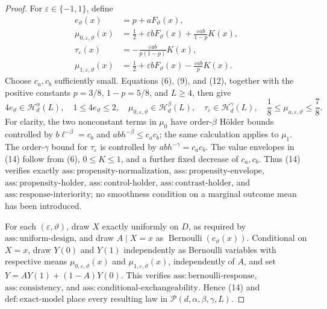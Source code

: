 \documentclass{article}
\begin{document}
\begin{proof}
For \(\varepsilon\in\{-1,1\}\), define
\[
\begin{aligned}
 e_\vartheta(x)&=p+aF_\vartheta(x),\\
 \mu_{0,\varepsilon,\vartheta}(x)
 &=\frac12+\varepsilon bF_\vartheta(x)
   +\frac{\varepsilon ab}{1-p}K(x),\\
 \tau_\varepsilon(x)&=-\frac{\varepsilon ab}{p(1-p)}K(x),\\
 \mu_{1,\varepsilon,\vartheta}(x)
 &=\frac12+\varepsilon bF_\vartheta(x)
   -\frac{\varepsilon ab}{p}K(x).
                                                                    \tag{13}
\end{aligned}
\]
Choose \(c_a,c_b\) sufficiently small.  Equations (6), (9), and (12), together with the positive constants \(p=3/8\), \(1-p=5/8\), and \(L\ge4\), then give
\[
 4e_\vartheta\in\mathcal H_d^\alpha(L),
 \quad 1\le4e_\vartheta\le2,
 \quad \mu_{0,\varepsilon,\vartheta}\in\mathcal H_d^\beta(L),
 \quad \tau_\varepsilon\in\mathcal H_d^\gamma(L),
 \quad \frac18\le\mu_{a,\varepsilon,\vartheta}\le\frac78.   \tag{14}
\]
For clarity, the two nonconstant terms in \(\mu_0\) have order-\(\beta\) H\"older bounds controlled by \(b\ell^{-\beta}=c_b\) and \(ab h^{-\beta}\le c_ac_b\); the same calculation applies to \(\mu_1\).  The order-\(\gamma\) bound for \(\tau_\varepsilon\) is controlled by \(ab h^{-\gamma}=c_ac_b\).  The value envelopes in (14) follow from (6), \(0\le K\le1\), and a further fixed decrease of \(c_a,c_b\).  Thus (14) verifies exactly \(\mathrm{ass:propensity\mbox{-}normalization}\), \(\mathrm{ass:propensity\mbox{-}envelope}\), \(\mathrm{ass:propensity\mbox{-}holder}\), \(\mathrm{ass:control\mbox{-}holder}\), \(\mathrm{ass:contrast\mbox{-}holder}\), and \(\mathrm{ass:response\mbox{-}interiority}\); no smoothness condition on a marginal outcome mean has been introduced.

For each \((\varepsilon,\vartheta)\), draw \(X\) exactly uniformly on \(D\), as required by \(\mathrm{ass:uniform\mbox{-}design}\), and draw \(A\mid X=x\) as \(\operatorname{Bernoulli}(e_\vartheta(x))\).  Conditional on \(X=x\), draw \(Y(0)\) and \(Y(1)\) independently as Bernoulli variables with respective means \(\mu_{0,\varepsilon,\vartheta}(x)\) and \(\mu_{1,\varepsilon,\vartheta}(x)\), independently of \(A\), and set \(Y=AY(1)+(1-A)Y(0)\).  This verifies \(\mathrm{ass:bernoulli\mbox{-}response}\), \(\mathrm{ass:consistency}\), and \(\mathrm{ass:conditional\mbox{-}exchangeability}\).  Hence (14) and \(\mathrm{def:exact\mbox{-}model}\) place every resulting law in \(\mathcal P(d,\alpha,\beta,\gamma,L)\).


\end{proof}
\end{document}
